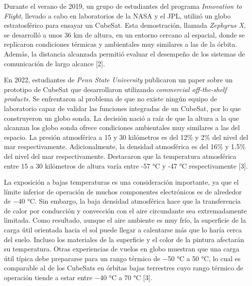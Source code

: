 \documentclass[12pt,a4paper]{article}
\begin{document}
Durante el verano de 2019, un grupo de estudiantes del programa \emph{Innovation to Flight}, llevado a cabo en laboratorios de la NASA y el JPL, utilizó un globo estratosférico para ensayar un CubeSat. Esta demostración, llamada \emph{Zephyrus X}, se desarrolló a unos 36 km de altura, en un entorno cercano al espacial, donde se replicaron condiciones térmicas y ambientales muy similares a las de la órbita. Además, la distancia alcanzada permitió evaluar el desempeño de los sistemas de comunicación de largo alcance {[}2{]}.

En 2022, estudiantes de \emph{Penn State University} publicaron un paper sobre un prototipo de CubeSat que desarrollaron utilizando \emph{commercial off-the-shelf products.} Se enfrentaron al problema de que no existe ningún equipo de laboratorio capaz de validar las funciones integradas de un CubeSat, por lo que construyeron un globo sonda. La decisión nació a raíz de que la altura a la que alcanzan los globo sonda ofrece condiciones ambientales muy similares a las del espacio. La presión atmosférica a 15 y 30 kilómetros es del 12\% y 2\% del nivel del mar respectivamente. Adicionalmente, la densidad atmosférica es del 16\% y 1.5\% del nivel del mar respectivamente. Destacaron que la temperatura atmosférica entre 15 a 30 kilómetros de altura varía entre -57 °C y -47 °C respectivamente {[}3{]}.

La exposición a bajas temperaturas es una consideración importante, ya que el límite inferior de operación de muchos componentes electrónicos es de alrededor de −40 °C. Sin embargo, la baja densidad atmosférica hace que la transferencia de calor por conducción y convección con el aire circundante sea extremadamente limitada. Como resultado, aunque el aire ambiente es muy frío, la superficie de la carga útil orientada hacia el sol puede llegar a calentarse más que lo haría cerca del suelo. Incluso los materiales de la superficie y el color de la pintura afectarán su temperatura. Otras experiencias de vuelos en globo muestran que una carga útil típica debe prepararse para un rango térmico de −50 °C a 50 °C, lo cual es comparable al de los CubeSats en órbitas bajas terrestres cuyo rango térmico de operación tiende a estar entre −40 °C a 70 °C {[}3{]}.
\end{document}
